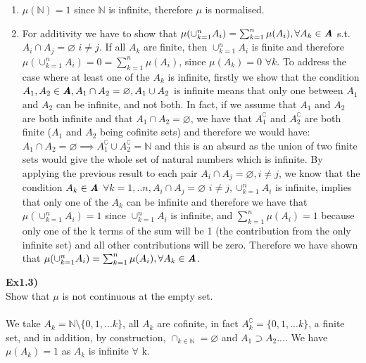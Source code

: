 \documentclass[12pt,mythesisstyle]{report}
\begin{document}
\begin{enumerate}
\item \(\mu(\mathbb{N})=1\) since \(\mathbb{N}\) is infinite, therefore \(\mu\) is normalised.
\item For additivity we have to show that \(\mu(\cup_{k=1}^nA_i)=\sum_{k=1}^n\mu(A_i), \forall A_k\in\textbf{\textit{A}}\) s.t. \(A_i\cap A_j=\varnothing\) \(i\neq j\). If all \(A_k\) are finite, then \(\cup_{k=1}^nA_i\) is finite and therefore \(\mu(\cup_{k=1}^nA_i)=0=\sum_{k=1}^n\mu(A_i)\), since \(\mu(A_k)=0\) \(\forall k\). To address the case where at least one of the \(A_k\) is infinite, firstly we show that the condition \(A_1, A_2\in\textbf{\textit{A}}, A_1\cap A_2=\varnothing, A_1\cup A_2\) is infinite means that only one between \(A_1\) and \(A_2\) can be infinite, and not both. In fact, if we assume that \(A_1\) and \(A_2\) are both infinite and that \(A_1\cap A_2=\varnothing\), we have that \(A_1^\complement\) and \(A_2^\complement\) are both finite (\(A_1\) and \(A_2\) being cofinite sets) and therefore we would have: \(A_1\cap A_2=\varnothing\implies A_1^\complement\cup A_2^\complement=\mathbb{N}\) and this is an absurd as the union of two finite sets would give the whole set of natural numbers which is infinite. By applying the previous result to each pair \(A_i\cap A_j=\varnothing,  i\neq j\), we know that the condition \(A_k\in\textbf{\textit{A}}\) \(\forall k=1,..n,A_i\cap A_j=\varnothing\) \(i\neq j,\cup_{k=1}^nA_i\) is infinite, implies that only one of the \(A_k\) can be infinite and therefore we have that \(\mu(\cup_{k=1}^nA_i)=1\) since \(\cup_{k=1}^nA_i\) is infinite, and \(\sum_{k=1}^n\mu(A_i)=1\) because only one of the k terms of the sum will be 1 (the contribution from the only infinite set) and all other contributions will be zero. Therefore we have shown that \(\mu(\cup_{k=1}^nA_i)=\sum_{k=1}^n\mu(A_i), \forall A_k\in\textbf{\textit{A}}\).
\end{enumerate}
\textbf{Ex1.3)}\\
Show that \(\mu\) is not continuous at the empty set.\\\\
We take $A_k=\mathbb{N}\setminus\{0,1,...k\}$, all $A_k$ are cofinite, in fact $A_k^\complement=\{0,1,...k\}$, a finite set, and in addition, by construction, $\cap_{k\in\mathbb{N}}=\varnothing$ and $A_1\supset A_2...$. We have $\mu(A_k)=1$ as $A_k$ is infinite $\forall$ k.
\end{document}
